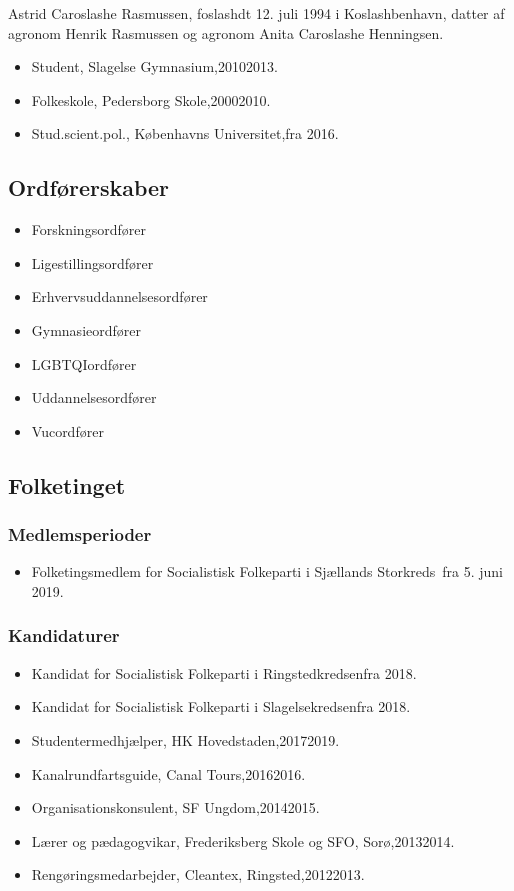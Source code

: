\documentclass[11pt, a4paper]{awesome-cv}
\begin{document}
\makecvheader[R]
\makelettertitle
\begin{cvletter}
Astrid Caroslashe Rasmussen, foslashdt 12. juli 1994 i Koslashbenhavn, datter af agronom Henrik Rasmussen og agronom Anita Caroslashe Henningsen.

\begin{itemize}
\item Student, Slagelse Gymnasium,20102013.
\item Folkeskole, Pedersborg Skole,20002010.
\item Stud.scient.pol., Københavns Universitet,fra 2016.
\end{itemize}
\subsection*{Ordførerskaber}
\begin{itemize}
\item Forskningsordfører
\item Ligestillingsordfører
\item Erhvervsuddannelsesordfører
\item Gymnasieordfører
\item LGBTQIordfører
\item Uddannelsesordfører
\item Vucordfører
\end{itemize}
\subsection*{Folketinget}
\subsubsection*{Medlemsperioder}
\begin{itemize}
\item Folketingsmedlem for Socialistisk Folkeparti i Sjællands Storkreds fra 5. juni 2019.
\end{itemize}
\subsubsection*{Kandidaturer}
\begin{itemize}
\item Kandidat for Socialistisk Folkeparti i Ringstedkredsenfra 2018.
\item Kandidat for Socialistisk Folkeparti i Slagelsekredsenfra 2018.
\end{itemize}
\begin{itemize}
\item Studentermedhjælper, HK Hovedstaden,20172019.
\item Kanalrundfartsguide, Canal Tours,20162016.
\item Organisationskonsulent, SF Ungdom,20142015.
\item Lærer og pædagogvikar, Frederiksberg Skole og SFO, Sorø,20132014.
\item Rengøringsmedarbejder, Cleantex, Ringsted,20122013.
\end{itemize}
\end{cvletter}
\end{document}
